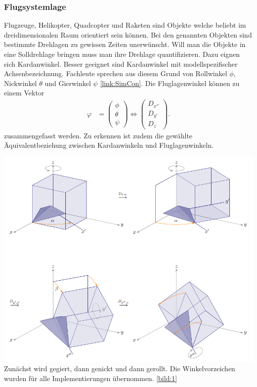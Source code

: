 \subsubsection{Flugsystemlage}
Flugzeuge, Helikopter, Quadcopter und Raketen sind Objekte welche beliebt im dreidimensionalen Raum orientiert sein können. Bei den genannten Objekten sind bestimmte Drehlagen zu gewissen Zeiten unerwünscht. Will man die Objekte in eine Solldrehlage bringen muss man ihre Drehlage quantifizieren. Dazu eignen sich Kardanwinkel. Besser geeignet sind Kardanwinkel mit modellspezifischer Achsenbezeichnung. Fachleute sprechen aus diesem Grund von Rollwinkel $\phi$, Nickwinkel $\theta$ und Gierwinkel $\psi$ \ref{link:SimCon}.
Die Fluglagenwinkel können zu einem Vektor
\begin{align}
	\varphi &= \begin{pmatrix}
		\phi\\
		\theta\\
		\psi
	\end{pmatrix}
	\Leftrightarrow 
	\begin{pmatrix}
		D_{x''}\\
		D_{y'}\\
		D_{z}
	\end{pmatrix}.
\end{align}
zusammengefasst werden. Zu erkennen ist zudem die gewählte Äquivalentbeziehung zwischen Kardanwinkeln und Fluglagenwinkeln.
\begin{center}
	\includegraphics[scale=0.5]{../images/0029 Roll-Pitch-Yaw.png}{\\Zunächst wird gegiert, dann genickt und dann gerollt. Die Winkelvorzeichen wurden für alle Implementierungen übernommen. \ref{bild:1}}
\end{center}


